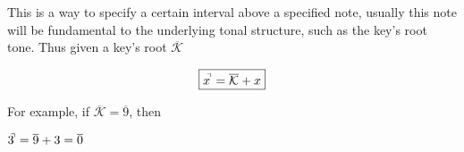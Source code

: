 \documentclass[preview]{standalone}
\begin{document}
\begin{center}
This is a way to specify a certain interval above a specified note, usually this note will be fundamental to the underlying tonal structure, such as the key's root tone. Thus given a key's root $ \overline{\mathcal{K}}$

	\[
	\boxed{x^{\hspace{-0.1cm}\urcorner} = \overline{\mathcal{K}} + x}
	\]

  For example, if $ \overline{\mathcal{K}} = \overline{9}$, then

	$3^{\hspace{-0.1cm}\urcorner} = \overline{9} + 3 = \overline{0}$
\end{center}
\end{document}
